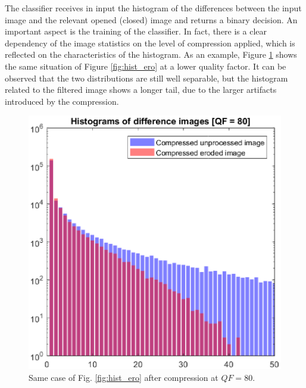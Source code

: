 \documentclass[review]{elsarticle}
\begin{document}
The classifier receives in input the histogram of the differences between the input image and the relevant opened (closed) image and returns a binary decision. An important aspect is the training of the classifier. In fact, there is a clear dependency of the image statistics on the level of compression applied, which is reflected on the characteristics of the histogram. As an example, Figure \ref{fig:hist_ero_80} shows the same situation of Figure \ref{fig:hist_ero} at a lower quality factor. It can be observed that the two distributions are still well separable, but the histogram related to the filtered image shows a longer tail, due to the larger artifacts introduced by the compression.

\begin{figure}[t!]%
	\centering
	\includegraphics[scale=0.55]{hist_ero_80.eps}
	\caption{Same case of Fig. \ref{fig:hist_ero} after compression at $QF = 80$.}
	\label{fig:hist_ero_80}%
\end{figure}
\end{document}
